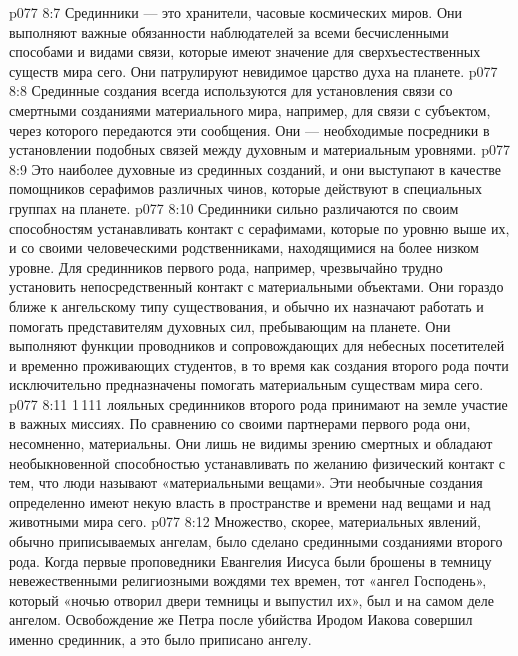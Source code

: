 \vs p077 8:7 \pc {}\bibnobreakspace {} Срединники --- это хранители, часовые космических миров. Они выполняют важные обязанности наблюдателей за всеми бесчисленными способами и видами связи, которые имеют значение для сверхъестественных существ мира сего. Они патрулируют невидимое царство духа на планете.
\vs p077 8:8 \pc {}\bibnobreakspace {} Срединные создания всегда используются для установления связи со смертными созданиями материального мира, например, для связи с субъектом, через которого передаются эти сообщения. Они --- необходимые посредники в установлении подобных связей между духовным и материальным уровнями.
\vs p077 8:9 \pc {}\bibnobreakspace {} Это наиболее духовные из срединных созданий, и они выступают в качестве помощников серафимов различных чинов, которые действуют в специальных группах на планете.
\vs p077 8:10 \pc Срединники сильно различаются по своим способностям устанавливать контакт с серафимами, которые по уровню выше их, и со своими человеческими родственниками, находящимися на более низком уровне. Для срединников первого рода, например, чрезвычайно трудно установить непосредственный контакт с материальными объектами. Они гораздо ближе к ангельскому типу существования, и обычно их назначают работать и помогать представителям духовных сил, пребывающим на планете. Они выполняют функции проводников и сопровождающих для небесных посетителей и временно проживающих студентов, в то время как создания второго рода почти исключительно предназначены помогать материальным существам мира сего.
\vs p077 8:11 1\,111 лояльных срединников второго рода принимают на земле участие в важных миссиях. По сравнению со своими партнерами первого рода они, несомненно, материальны. Они лишь не видимы зрению смертных и обладают необыкновенной способностью устанавливать по желанию физический контакт с тем, что люди называют «материальными вещами». Эти необычные создания определенно имеют некую власть в пространстве и времени над вещами и над животными мира сего.
\vs p077 8:12 Множество, скорее, материальных явлений, обычно приписываемых ангелам, было сделано срединными созданиями второго рода. Когда первые проповедники Евангелия Иисуса были брошены в темницу невежественными религиозными вождями тех времен, тот «ангел Господень», который «ночью отворил двери темницы и выпустил их», был и на самом деле ангелом. Освобождение же Петра после убийства Иродом Иакова совершил именно срединник, а это было приписано ангелу.
